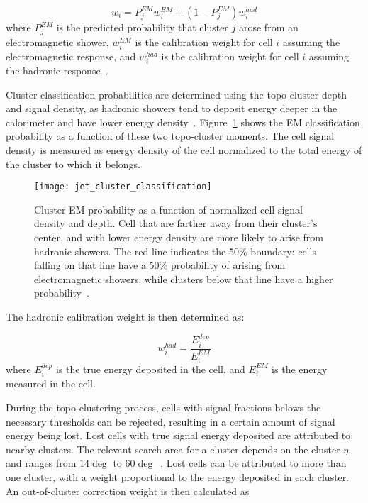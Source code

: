 \begin{equation}\label{eq:lcw_weights}
    w_i = P_{j}^{EM}w_i^{EM}+\left(1-P^{EM}_j\right)w_i^{had}
\end{equation}
where $P_j^{EM}$ is the predicted probability that cluster $j$ arose from an electromagnetic shower, $w_{i}^{EM}$ is the calibration weight for cell $i$ assuming the electromagnetic response, and $w_{i}^{had}$ is the calibration weight for cell $i$ assuming the hadronic response~\cite{jet-topo-cluster}.

Cluster classification probabilities are determined using the topo-cluster depth and signal density, as hadronic showers tend to deposit energy deeper in the calorimeter and have lower energy density~\cite{jet-topo-cluster}.
Figure~\ref{fig:jet_cluster_classification} shows the EM classification probability as a function of these two topo-cluster moments.
The cell signal density is measured as energy density of the cell normalized to the total energy of the cluster to which it belongs.

\begin{figure}[!ht]
    \centering
\texttt{[image: jet\_cluster\_classification]}
\caption{Cluster EM probability as a function of normalized cell signal density and depth.
Cell that are farther away from their cluster's center, and with lower energy density are more likely to arise
from hadronic showers.
The red line indicates the 50\% boundary: cells falling on that line have a 50\% probability of arising from
electromagnetic showers, while clusters below that line have a higher probability~\cite{jet-topo-cluster}.}
\label{fig:jet_cluster_classification}
\end{figure}
The hadronic calibration weight is then determined as:

\begin{equation}\label{eq:had_cal_weight}
    w_{i}^{had} = \frac{E^{dep}_i}{E^{EM}_i}
\end{equation}
where $E^{dep}_i$ is the true energy deposited in the cell, and $E^{EM}_i$ is the energy measured in the cell.

During the topo-clustering process, cells with signal fractions belows the necessary thresholds can be rejected, resulting in a certain amount of signal energy being lost.
Lost cells with true signal energy deposited are attributed to nearby clusters.
The relevant search area for a cluster depends on the cluster $\eta$, and ranges from $14\deg$ to $60\deg$~\cite{jet-topo-cluster}.
Lost cells can be attributed to more than one cluster, with a weight proportional to the energy deposited in each cluster.
An out-of-cluster correction weight is then calculated as


